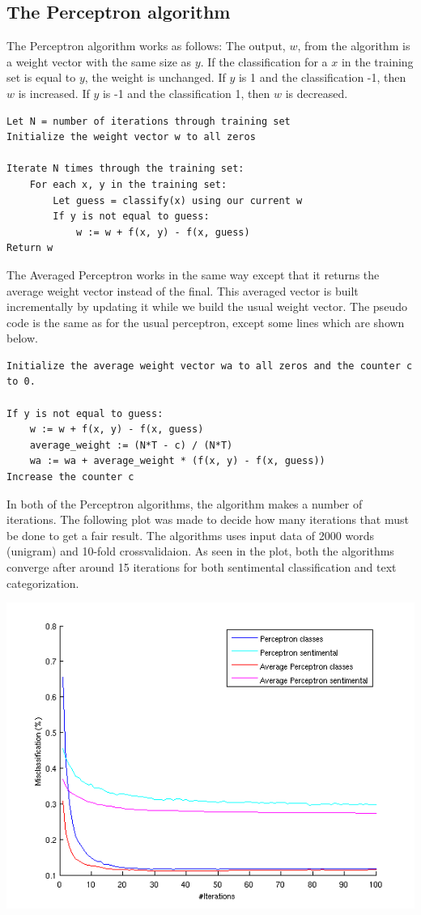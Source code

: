 \subsection{The Perceptron algorithm}
The Perceptron algorithm works as follows: 
The output, $w$, from the algorithm is a weight vector with the same size as $y$. If the classification for a $x$ in the training set is equal to $y$, the weight is unchanged.
If $y$ is 1 and the classification -1, then $w$ is increased. If $y$ is -1 and the classification 1, then $w$ is decreased. \citep{perceptron_ai}
\begin{verbatim}
Let N = number of iterations through training set
Initialize the weight vector w to all zeros

Iterate N times through the training set:
    For each x, y in the training set:
        Let guess = classify(x) using our current w
        If y is not equal to guess:
            w := w + f(x, y) - f(x, guess)
Return w
\end{verbatim}
The Averaged Perceptron works in the same way except that it returns the average weight vector instead of the final.
This averaged vector is built incrementally by updating it while we build the usual weight vector. The pseudo code is the same as for the usual perceptron, except some lines which are shown below.
\begin{verbatim}
Initialize the average weight vector wa to all zeros and the counter c to 0.

If y is not equal to guess:
    w := w + f(x, y) - f(x, guess)
    average_weight := (N*T - c) / (N*T)
    wa := wa + average_weight * (f(x, y) - f(x, guess))
Increase the counter c
\end{verbatim}
In both of the Perceptron algorithms, the algorithm makes a number of iterations. The following plot was made to decide how many iterations that must be done to get a fair result. The algorithms uses input data of 2000 words (unigram) and 10-fold crossvalidaion. As seen in the plot, both the algorithms converge after around 15 iterations for both sentimental classification and text categorization.
\begin{center}
\includegraphics[scale = 0.8]{fig/perceptron_2000words_unigram_10foldcv_classes-high_sentimental-low.png}
\end{center}

